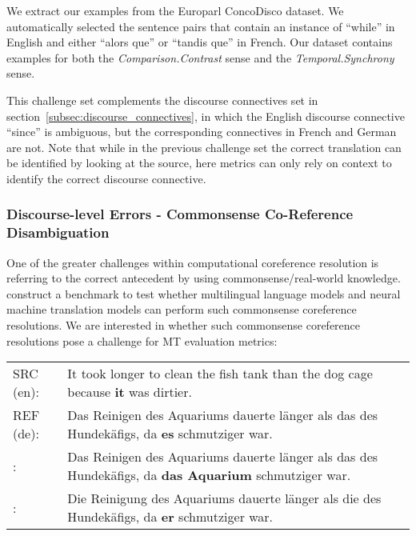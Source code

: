 \documentclass[11pt]{article}
\newcommand{\cmark}{\textcolor{darkpastelgreen}{\ding{51}}}\newcommand{\xmark}{\textcolor{darkpastelred}{\ding{55}}}
\begin{document}
We extract our examples from the Europarl ConcoDisco dataset. We automatically selected the sentence pairs that contain an instance of ``while'' in English and either ``alors que'' or ``tandis que'' in French. Our dataset contains examples for both the \textit{Comparison.Contrast} sense and the \textit{Temporal.Synchrony} sense.

This challenge set complements the discourse connectives set in section~\ref{subsec:discourse_connectives}, in which the English discourse connective ``since'' is ambiguous, but the corresponding connectives in French and German are not. Note that while in the previous challenge set the correct translation can be identified by looking at the source, here metrics can only rely on context to identify the correct discourse connective.

\subsubsection{Discourse-level Errors - Commonsense Co-Reference Disambiguation}
\label{sec:commonsense-coref}
One of the greater challenges within computational coreference resolution is referring to the correct antecedent by using commonsense/real-world knowledge. \citet{emelin-sennrich-2021-wino} construct a benchmark to test whether multilingual language models and neural machine translation models can perform such commonsense coreference resolutions. We are interested in whether such commonsense coreference resolutions pose a challenge for MT evaluation metrics:

\begin{small}
     \vspace{0.5cm}
\begin{tabularx}{0.95\columnwidth}{lX}
\setlength{\extrarowheight}{0.1cm}

     SRC (en): & It took longer to clean the fish tank than the dog cage because \textbf{it} was dirtier.	\\
     REF (de): & Das Reinigen des Aquariums dauerte länger als das des Hundekäfigs, da \textbf{es} schmutziger war.\\
     \cmark : & Das Reinigen des Aquariums dauerte länger als das des Hundekäfigs, da \textbf{das Aquarium} schmutziger war.		\\
    
     \xmark{} : & Die Reinigung des Aquariums dauerte länger als die des Hundekäfigs, da \textbf{er} schmutziger war.	
     \vspace{0.35cm}
\end{tabularx}
\end{small}
\end{document}
